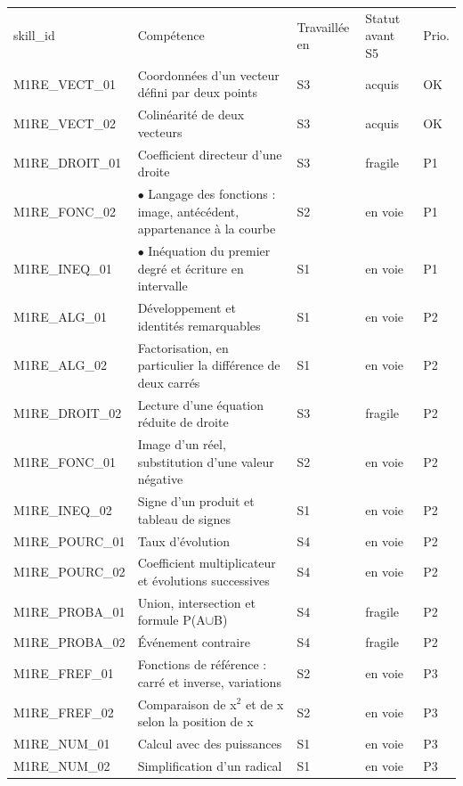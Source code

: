\documentclass[10pt,a4paper]{article}
\begin{document}
\par\noindent\begin{tabularx}{\linewidth}{>{\ttfamily\scriptsize}p{27mm} X >{\scriptsize}p{16mm} >{\scriptsize}p{20mm} >{\scriptsize\centering\arraybackslash}p{9mm}}
\rowcolor{Navy}\color{white}\scriptsize skill\_id & \color{white}Compétence & \color{white}Travaillée en & \color{white}Statut avant S5 & \color{white}Prio. \\
M1RE\_VECT\_01 & Coordonnées d'un vecteur défini par deux points & S3 & acquis & OK \\
M1RE\_VECT\_02 & Colinéarité de deux vecteurs & S3 & acquis & OK \\
M1RE\_DROIT\_01 & Coefficient directeur d'une droite & S3 & fragile & P1 \\
M1RE\_FONC\_02 & $\bullet$ Langage des fonctions : image, antécédent, appartenance à la courbe & S2 & en voie & P1 \\
M1RE\_INEQ\_01 & $\bullet$ Inéquation du premier degré et écriture en intervalle & S1 & en voie & P1 \\
M1RE\_ALG\_01 & Développement et identités remarquables & S1 & en voie & P2 \\
M1RE\_ALG\_02 & Factorisation, en particulier la différence de deux carrés & S1 & en voie & P2 \\
M1RE\_DROIT\_02 & Lecture d'une équation réduite de droite & S3 & fragile & P2 \\
M1RE\_FONC\_01 & Image d'un réel, substitution d'une valeur négative & S2 & en voie & P2 \\
M1RE\_INEQ\_02 & Signe d'un produit et tableau de signes & S1 & en voie & P2 \\
M1RE\_POURC\_01 & Taux d'évolution & S4 & en voie & P2 \\
M1RE\_POURC\_02 & Coefficient multiplicateur et évolutions successives & S4 & en voie & P2 \\
M1RE\_PROBA\_01 & Union, intersection et formule P(A$\cup$B) & S4 & fragile & P2 \\
M1RE\_PROBA\_02 & Événement contraire & S4 & fragile & P2 \\
M1RE\_FREF\_01 & Fonctions de référence : carré et inverse, variations & S2 & en voie & P3 \\
M1RE\_FREF\_02 & Comparaison de x$^2$ et de x selon la position de x & S2 & en voie & P3 \\
M1RE\_NUM\_01 & Calcul avec des puissances & S1 & en voie & P3 \\
M1RE\_NUM\_02 & Simplification d'un radical & S1 & en voie & P3 \\
\end{tabularx}
\end{document}
